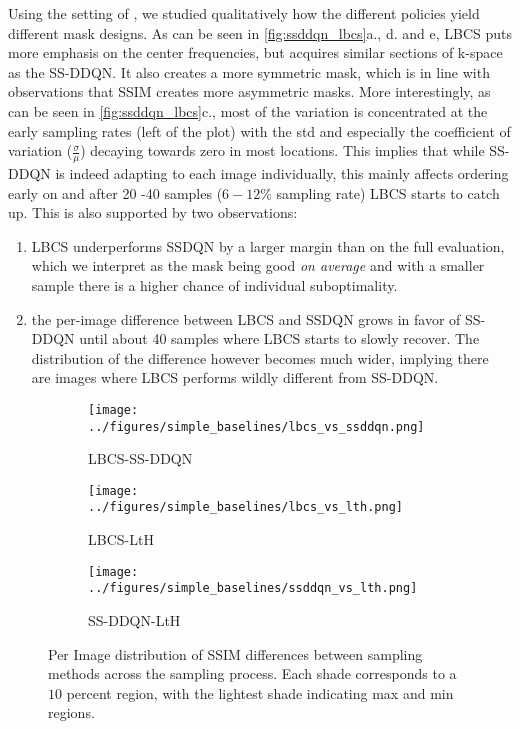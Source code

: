 Using the setting of \citet{pineda2020active}, we studied qualitatively how the different policies yield different mask designs.  As can be seen in \cref{fig:ssddqn_lbcs}a., d. and e, LBCS puts more emphasis on the center frequencies, but acquires similar sections of k-space as the SS-DDQN.
It also creates a more symmetric mask, which is in line with \cite{pineda2020active} observations that SSIM creates more asymmetric masks.
More interestingly, as can be seen in \cref{fig:ssddqn_lbcs}c., most of the variation is concentrated at the early sampling rates (left of the plot) with the std and especially the coefficient of variation ($\frac{\sigma}{\mu}$) decaying towards zero in most locations.
This implies that while SS-DDQN is indeed adapting to each image individually, this mainly affects ordering early on and after 20 -40  samples ($6-12\%$ sampling rate) LBCS starts to catch up.
This is also supported by two observations:

\begin{enumerate}%
    \item LBCS underperforms SSDQN by a larger margin than on the full evaluation, which we interpret as the mask being good \emph{on average} and with a smaller sample there is a higher chance of individual suboptimality.
    \item the per-image difference between LBCS and SSDQN grows in favor of SS-DDQN until about 40 samples where LBCS starts to slowly recover. The distribution of the difference however becomes much wider, implying there are images where LBCS performs wildly different from SS-DDQN.
\end{enumerate}

\begin{figure}[!ht]
    \centering
    \begin{subfigure}[b]{0.3\textwidth}
    \centering
    \texttt{[image: ../figures/simple\_baselines/lbcs\_vs\_ssddqn.png]}
    \caption{LBCS-SS-DDQN}
    \label{fig:lbcs_vs_ssddqn}
    \end{subfigure}
    \hfill
    \begin{subfigure}[b]{0.3\textwidth}
    \centering
    \texttt{[image: ../figures/simple\_baselines/lbcs\_vs\_lth.png]}
    \caption{LBCS-LtH}
    \label{fig:lbcs_vs_lth}
    \end{subfigure}
    \hfill
    \begin{subfigure}[b]{0.3\textwidth}
    \centering
    \texttt{[image: ../figures/simple\_baselines/ssddqn\_vs\_lth.png]}
    \caption{SS-DDQN-LtH}
    \label{fig:ssddqn_vs_lth}
    \end{subfigure}
    \caption{Per Image distribution of SSIM differences between sampling methods across the sampling process. Each shade corresponds to a $10$ percent region, with the lightest shade indicating max and min regions.}
\end{figure}

